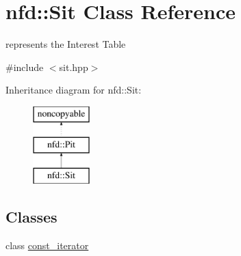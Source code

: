 \hypertarget{classnfd_1_1Sit}{}\section{nfd\+:\+:Sit Class Reference}
\label{classnfd_1_1Sit}


represents the Interest Table  




{\ttfamily \#include $<$sit.\+hpp$>$}

Inheritance diagram for nfd\+:\+:Sit\+:\begin{figure}[H]
\begin{center}
\leavevmode
\includegraphics[height=3.000000cm]{classnfd_1_1Sit}
\end{center}
\end{figure}
\subsection*{Classes}
\begin{DoxyCompactItemize}
\item 
class \hyperlink{classnfd_1_1Sit_1_1const__iterator}{const\+\_\+iterator}
\end{DoxyCompactItemize}
